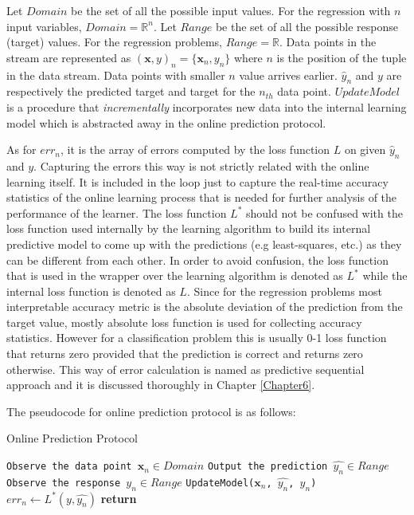 {Let $Domain$ be the set of all the possible input values. For the regression with $n$ input variables, $Domain = \mathbb{R}^n$. Let $Range$ be the set of all the possible response (target) values. For the regression problems, $Range = \mathbb{R}$. Data points in the stream are represented as $(\pmb{x}, y)_n=\{\pmb{x}_n,y_n\}$ where $n$ is the position of the tuple in the data stream. Data points with smaller $n$ value arrives earlier. $\hat{y}_n$ and $y$ are respectively the predicted target and target for the $n_{th}$ data point. $UpdateModel$ is a procedure that \textit{incrementally} incorporates new data into the internal learning model which is abstracted away in the online prediction protocol.

As for $err_n$, it is the array of errors computed by the loss function $L$ on given $\hat{y}_n$ and $y$. Capturing the errors this way is not strictly related with the online learning itself. It is included in the loop just to capture the real-time accuracy statistics of the online learning process that is needed for further analysis of the performance of the learner. The loss function $L^*$ should not be confused with the loss function used internally by the learning algorithm to build its internal predictive model to come up with the predictions (e.g least-squares, etc.) as they can be different from each other. In order to avoid confusion, the loss function that is used in the wrapper over the learning algorithm is denoted as $L^*$ while the internal loss function is denoted as $L$. Since for the regression problems most interpretable accuracy metric is the absolute deviation of the prediction from the target value, mostly absolute loss function is used for collecting accuracy statistics. However for a classification problem this is usually 0-1 loss function that returns zero provided that the prediction is correct and returns zero otherwise. This way of error calculation is named as predictive sequential approach and it is discussed thoroughly in Chapter \ref{Chapter6}. 

The pseudocode for online prediction protocol is as follows:

\begin{algorithm}
  \caption{Online Prediction Protocol}\label{alg:opp}
  \begin{algorithmic}[1]
    		\State \texttt{Observe the data point $\pmb{x}_n \in Domain$}
        	\State \texttt{Output the prediction $\hat{y_n} \in Range$}
        	\State \texttt{Observe the response $y_n \in Range$}
        	\State \texttt{UpdateModel($\pmb{x}_n$, $\hat{y_n}$, $y_n$)}
        	\State $err_n \gets L^*(y, \hat{y_n})$
    	\EndWhile
		\State \textbf{return}
    \EndProcedure
  \end{algorithmic}
\end{algorithm}

}
